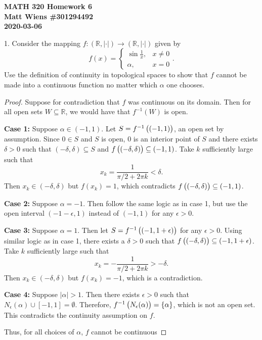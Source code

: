 \documentclass{article}
\newcommand{\R}{\mathbb{R}}
\begin{document}
\textbf{MATH 320 Homework 6} \\
\textbf{Matt Wiens \#301294492} \\
\textbf{2020-03-06}

1. Consider the mapping $f: (\R, |\cdot|) \to (\R, |\cdot|)$ given by
%
\begin{equation*}
   f(x)
    = \begin{cases}
        \sin \frac{1}{x}, & x \neq 0 \\
        \alpha, & x = 0
   \end{cases}
   .
\end{equation*}
%
Use the definition of continuity in topological spaces to show that $f$
cannot be made into a continuous function no matter which $\alpha$ one
chooses.

\begin{proof}

Suppose for contradiction that $f$ was continuous on its domain. Then
for all open sets $W \subseteq \R$, we would have that $f^{-1}(W)$ is
open.

\textbf{Case 1:} Suppose $\alpha \in (-1, 1)$. Let $S = f^{-1} \del{(-1,
1)}$, an open set by assumption. Since $0 \in S$ and $S$ is open, $0$ is
an interior point of $S$ and there exists $\delta > 0$ such that
$(-\delta, \delta) \subseteq S$ and $f\del{(-\delta, \delta)} \subseteq
(-1, 1)$. Take $k$ sufficiently large such that
%
\begin{equation*}
    x_k = \frac{1}{\pi / 2 + 2 \pi k} < \delta
    .
\end{equation*}
%
Then $x_k \in (-\delta, \delta)$ but $f(x_k) = 1$, which contradicts
$f\del{(-\delta, \delta)} \subseteq (-1, 1)$.

\textbf{Case 2:} Suppose $\alpha = -1$. Then follow the same logic as in
case 1, but use the open interval $(-1 - \epsilon, 1)$ instead of $(-1,
1)$ for any $\epsilon > 0$.

\textbf{Case 3:} Suppose $\alpha = 1$. Then let $S = f^{-1}\del{(-1, 1 +
\epsilon)}$ for any $\epsilon > 0$. Using similar logic as in case 1,
there exists a $\delta > 0$ such that $f\del{(-\delta, \delta)}
\subseteq (-1, 1 + \epsilon)$. Take $k$ sufficiently large such that
%
\begin{equation*}
    x_k = - \frac{1}{\pi / 2 + 2 \pi k} > - \delta
    .
\end{equation*}
%
Then $x_k \in (-\delta, \delta)$ but $f(x_k) = -1$, which is a
contradiction.

\textbf{Case 4:} Suppose $|\alpha| > 1$. Then there exists $\epsilon >
0$ such that $N_\epsilon(\alpha) \cup [-1, 1] = \emptyset$. Therefore,
$f^{-1}\del{N_\epsilon(\alpha)} = \cbr{\alpha}$, which is not an open
set. This contradicts the continuity assumption on $f$.

Thus, for all choices of $\alpha$, $f$ cannot be continuous

\end{proof}
\end{document}
